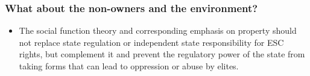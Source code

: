 \documentclass{beamer}
\begin{document}
\begin{frame}

\frametitle{What about the non-owners and the environment?}

\begin{itemize}
\item The social function theory and corresponding emphasis on property should not replace state regulation or independent state responsibility for ESC rights, but complement it and prevent the regulatory power of the state from taking forms that can lead to oppression or abuse by elites.
\end{itemize}
\end{frame}
\end{document}
